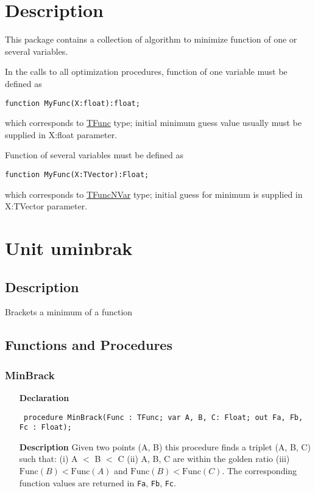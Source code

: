 \documentclass[12pt,a4paper,oneside]{report}
\newcommand{\declarationitem}[1]{\textbf{#1}}
\newcommand{\descriptiontitle}[1]{\textbf{#1}}
\newcommand{\code}[1]{\texttt{#1}}
\begin{document}
\section{Description}
This package contains a collection of algorithm to minimize function of one or several variables. 

\noindent In the calls to all optimization procedures, function of one variable must be defined as 

\code{function MyFunc(X:float):float;} 

\noindent which corresponds to \hyperref[utypes-TFunc]{TFunc} type; initial minimum guess value usually must be supplied in X:float parameter.

\noindent Function of several variables must be defined as 

\code{function MyFunc(X:TVector):Float;}

\noindent which corresponds to \hyperref[utypes-TFuncNVar]{TFuncNVar} type; initial guess for minimum is supplied in X:TVector parameter.
\section{Unit uminbrak}
\label{uminbrak}
\subsection{Description}
Brackets a minimum of a function 
\subsection{Functions and Procedures}
\subsubsection{MinBrack}
\label{uminbrak-MinBrack}
\begin{itemize}\item[\declarationitem{Declaration}\hfill]
	\begin{flushleft}
		\code{
			procedure MinBrack(Func : TFunc; var A, B, C: Float; out Fa, Fb, Fc : Float);}
	\end{flushleft}
	\item[\descriptiontitle{Description}]
	Given two points (A, B) this procedure finds a triplet (A, B, C) such that: (i) A {$<$} B {$<$} C (ii) A, B, C are within the golden ratio (iii) $\textrm{Func}(B) < \textrm{Func}(A)$ and $\textrm{Func}(B) < \textrm{Func}(C)$. The corresponding function values are returned in \code{Fa}, \code{Fb}, \code{Fc}.
\end{itemize}
\end{document}
